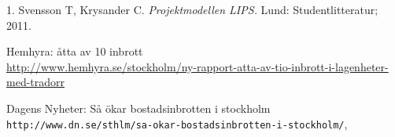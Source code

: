 \documentclass[twocolumn]{article}
\begin{document}
\newpage
\begin{thebibliography}{1}

1. Svensson T, Krysander C. \emph{Projektmodellen LIPS.} Lund: Studentlitteratur; 2011.

 Hemhyra: åtta av 10 inbrott\\
\url{http://www.hemhyra.se/stockholm/ny-rapport-atta-av-tio-inbrott-i-lagenheter-med-tradorr}
\\\date{2016-02-05}

Dagens Nyheter: Så ökar bostadsinbrotten i stockholm\\\texttt{http://www.dn.se/sthlm/sa-okar-bostadsinbrotten-i-stockholm/}, \date{2016-02-05}

\end{thebibliography}
\end{document}
